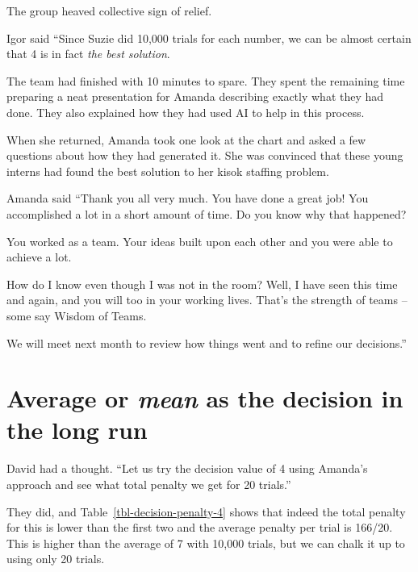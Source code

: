\documentclass[
  12pt,
  letterpaper,
  DIV=11,
  numbers=noendperiod]{scrreprt}
\begin{document}
The group heaved collective sign of relief.

Igor said ``Since Suzie did 10,000 trials for each number, we can be
almost certain that 4 is in fact \emph{the best solution}.

The team had finished with 10 minutes to spare. They spent the remaining
time preparing a neat presentation for Amanda describing exactly what
they had done. They also explained how they had used AI to help in this
process.

When she returned, Amanda took one look at the chart and asked a few
questions about how they had generated it. She was convinced that these
young interns had found the best solution to her kisok staffing problem.

Amanda said ``Thank you all very much. You have done a great job! You
accomplished a lot in a short amount of time. Do you know why that
happened?

You worked as a team. Your ideas built upon each other and you were able
to achieve a lot.

How do I know even though I was not in the room? Well, I have seen this
time and again, and you will too in your working lives. That's the
strength of teams -- some say Wisdom of Teams.

We will meet next month to review how things went and to refine our
decisions.''

\section{\texorpdfstring{Average or \emph{mean} as the decision in the
long
run}{Average or mean as the decision in the long run}}\label{average-or-mean-as-the-decision-in-the-long-run}

David had a thought. ``Let us try the decision value of 4 using Amanda's
approach and see what total penalty we get for 20 trials.''

They did, and Table~\ref{tbl-decision-penalty-4} shows that indeed the
total penalty for this is lower than the first two and the average
penalty per trial is 166/20. This is higher than the average of 7 with
10,000 trials, but we can chalk it up to using only 20 trials.
\end{document}
